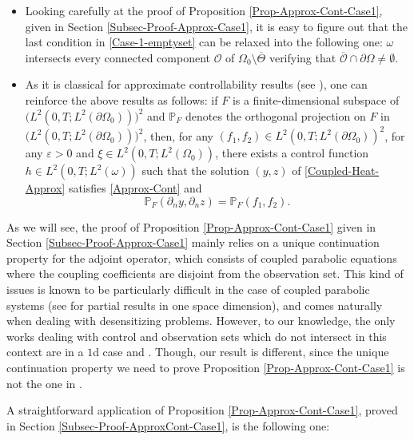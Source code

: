 \skpt
\begin{remark}
\begin{itemize}
\item Looking carefully at the proof of Proposition \ref{Prop-Approx-Cont-Case1}, given in Section \ref{Subsec-Proof-Approx-Case1}, it is easy to figure out that the last condition in \eqref{Case-1-emptyset} can be relaxed {into the following one: $\omega$ intersects every connected component $\mathcal O$ of $\Omega_0 \setminus \overline\Theta$ verifying that $\overline{\mathcal O} \cap \partial \Omega \not = \emptyset$.}

\item As it is classical for approximate controllability results (see \cite{Zuazua-97,FernandezCaraZuazua1,Ervedoza-Note-2020}), one can reinforce the above results as follows: if $F$ is a finite-dimensional subspace of $\bigl(L^2(0, T; L^2(\partial \Omega_0))\bigr)^2$ and $\mathbb{P}_F$ denotes the orthogonal projection on $F$ in $\bigl(L^2(0, T; L^2(\partial \Omega_0))\bigr)^2$, then, for any $(f_1, f_2) \in L^2(0,T; L^2(\partial \Omega_0))^2$, for any $\varepsilon >0$ and $\xi \in L^2(0,T; L^2(\Omega_0))$, there exists a control function $h \in L^2(0,T; L^2(\omega))$ such that the solution $(y,z)$ of \eqref{Coupled-Heat-Approx} satisfies \eqref{Approx-Cont} and
\[
\mathbb{P}_F (\partial_n y, \partial_n z) = \mathbb{P}_F (f_1, f_2).
\]
\end{itemize}
\end{remark}

As we will see, the proof of Proposition \ref{Prop-Approx-Cont-Case1} given in Section \ref{Subsec-Proof-Approx-Case1} mainly relies on a unique continuation property for the adjoint operator, which consists of coupled parabolic equations where the coupling coefficients are disjoint from the observation set. This kind of issues is known to be particularly difficult in the case of coupled parabolic systems (see \eg \cite{mousquetaires} for partial results in one space dimension), and comes naturally when dealing with desensitizing problems. However, to our knowledge, the only works dealing with control and observation sets which do not intersect in this context are \cite{Micu-Ortega-deTeresa} in a $1$d case and \cite{Kavian-De-Teresa}. Though, our result is different, since the unique continuation property we need to prove Proposition \ref{Prop-Approx-Cont-Case1} is not the one in \cite{Micu-Ortega-deTeresa,Kavian-De-Teresa}.

A straightforward application of Proposition \ref{Prop-Approx-Cont-Case1}, proved in Section \ref{Subsec-Proof-ApproxCont-Case1}, is the following one:

